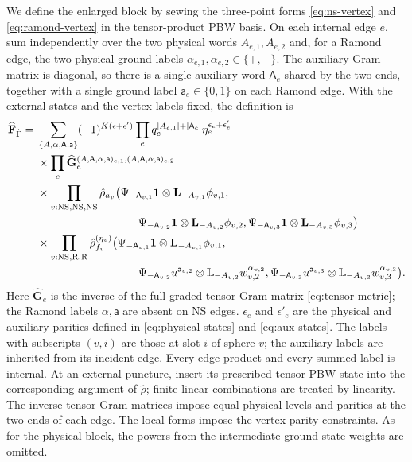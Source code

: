 \documentclass[11pt]{article}
\newcommand{\NS}{\mathrm{NS}}
\newcommand{\R}{\mathrm R}
\numberwithin{equation}{section}
\begin{document}
We define the enlarged block by sewing the three-point forms
\eqref{eq:ns-vertex} and \eqref{eq:ramond-vertex} in the tensor-product
PBW basis. On each internal edge $e$, sum independently over the two
physical words $A_{e,1},A_{e,2}$ and, for a Ramond edge, the two physical
ground labels $\alpha_{e,1},\alpha_{e,2}\in\{+,-\}$. The auxiliary
Gram matrix is diagonal, so there is a single auxiliary word
$\mathsf A_e$ shared by the two ends, together with a single ground
label $\mathsf a_e\in\{0,1\}$ on each Ramond edge. With the external
states and the vertex labels fixed, the definition is
\begin{align}
 \widehat{\mathbf F}_{\hat\Gamma}
 ={}&\sum_{\{A,\alpha,\mathsf A,\mathsf a\}}
 (-1)^{K(\epsilon+\epsilon')}
 \prod_e q_e^{|A_{e,1}|+|\mathsf A_e|}
          \eta_e^{\epsilon_e+\epsilon'_e}
 \nonumber\\
 &\times\prod_e
 \widehat{\mathbf G}_e^{
  (A,\mathsf A,\alpha,\mathsf a)_{e,1},
  (A,\mathsf A,\alpha,\mathsf a)_{e,2}}
 \nonumber\\
 &\times\prod_{v:\NS,\NS,\NS}\hat\rho_{a_v}\bigl(
       \Psi_{-\mathsf A_{v,1}}\mathbf1\otimes
                       \mathbf L_{-A_{v,1}}\phi_{v,1},
 \nonumber\\
 &\hspace{32mm}
       \Psi_{-\mathsf A_{v,2}}\mathbf1\otimes
                       \mathbf L_{-A_{v,2}}\phi_{v,2},
       \Psi_{-\mathsf A_{v,3}}\mathbf1\otimes
                       \mathbf L_{-A_{v,3}}\phi_{v,3}\bigr)
 \nonumber\\
 &\times\prod_{v:\NS,\R,\R}
 \hat\rho_{f_v}^{(\eta_v)}\bigl(
       \Psi_{-\mathsf A_{v,1}}\mathbf1\otimes
                       \mathbf L_{-A_{v,1}}\phi_{v,1},
 \nonumber\\
 &\hspace{32mm}
       \Psi_{-\mathsf A_{v,2}}u^{\mathsf a_{v,2}}\otimes
                       \mathbb L_{-A_{v,2}}w_{v,2}^{\alpha_{v,2}},
       \Psi_{-\mathsf A_{v,3}}u^{\mathsf a_{v,3}}\otimes
                       \mathbb L_{-A_{v,3}}w_{v,3}^{\alpha_{v,3}}\bigr).
 \label{eq:enlarged-block}
\end{align}
Here $\widehat{\mathbf G}_e$ is the inverse of the full graded tensor
Gram matrix \eqref{eq:tensor-metric}; the Ramond labels
$\alpha,\mathsf a$ are absent on NS edges.
$\epsilon_e$ and $\epsilon'_e$ are the physical and auxiliary
parities defined in \eqref{eq:physical-states} and \eqref{eq:aux-states}.
The labels with subscripts $(v,i)$ are those at slot $i$ of sphere $v$;
the auxiliary labels are inherited from its incident edge. Every edge
product and every summed label is internal. At an external puncture,
insert its prescribed tensor-PBW state into the corresponding argument
of $\hat\rho$; finite linear combinations are treated by linearity.
The inverse tensor Gram matrices impose equal physical levels and
parities at the two ends of each edge. The local forms impose the vertex
parity constraints. As for the physical block, the powers from the
intermediate ground-state weights are omitted.
\end{document}
